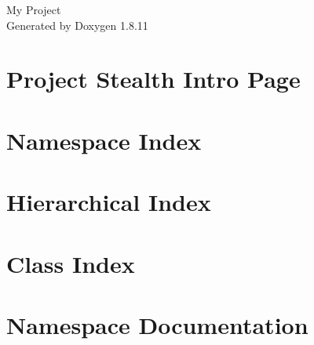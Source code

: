 \documentclass[twoside]{book}
\newcommand{\+}{\discretionary{\mbox{\scriptsize$\hookleftarrow$}}{}{}}
\newcommand{\clearemptydoublepage}{%
  \newpage{\pagestyle{empty}\cleardoublepage}%
}
\begin{document}
\hypersetup{pageanchor=false,
             bookmarksnumbered=true,
             pdfencoding=unicode
            }
\begin{titlepage}
\vspace*{7cm}
\begin{center}%
{\Large My Project }\\
\vspace*{1cm}
{\large Generated by Doxygen 1.8.11}\\
\end{center}
\end{titlepage}
\clearemptydoublepage
\tableofcontents
\clearemptydoublepage
{}
\hypersetup{pageanchor=true}

\chapter{Project Stealth Intro Page}
\label{md_README}
\hypertarget{md_README}{}

\chapter{Namespace Index}

\chapter{Hierarchical Index}

\chapter{Class Index}

\chapter{Namespace Documentation}









\end{document}
